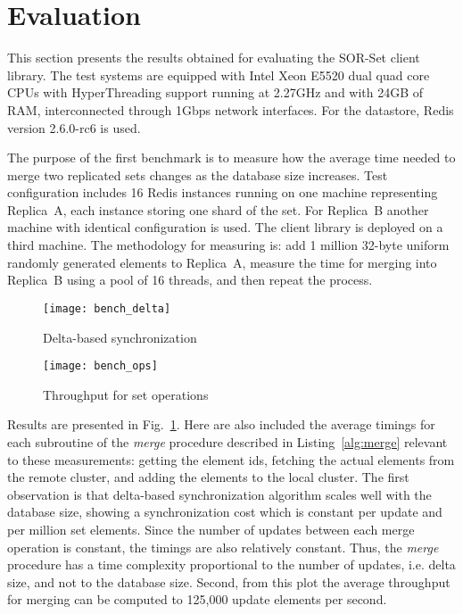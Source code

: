 \section{Evaluation}
\label{sec:evaluation}

This section presents the results obtained for evaluating the SOR-Set client
library. The test systems are equipped with Intel Xeon E5520 dual quad core
CPUs with HyperThreading support running at 2.27GHz and with 24GB of RAM,
interconnected through 1Gbps network interfaces. For the datastore, Redis
version 2.6.0-rc6 is used.

The purpose of the first benchmark is to measure how the average time needed to
merge two replicated sets changes as the database size increases. Test
configuration includes 16 Redis instances running on one machine representing
Replica~A, each instance storing one shard of the set. For Replica~B another
machine with identical configuration is used. The client library is deployed
on a third machine. The methodology for measuring is: add 1 million 32-byte
uniform randomly generated elements to Replica~A, measure the time for merging
into Replica~B using a pool of 16 threads, and then repeat the process.

\begin{figure}[t]
  \centering
  \begin{minipage}{1\linewidth}
    \centering
    \texttt{[image: bench\_delta]}
    \caption{Delta-based synchronization}
    \label{fig:bench_delta}
  \end{minipage}
\end{figure}

\begin{figure}[t]
  \centering
  \begin{minipage}{1\linewidth}
    \centering
    \texttt{[image: bench\_ops]}
    \caption{Throughput for set operations}
    \label{fig:bench_ops}
  \end{minipage}
\end{figure}

Results are presented in Fig.~\ref{fig:bench_delta}. Here are also included the
average timings for each subroutine  of the \textit{merge} procedure described
in Listing~\ref{alg:merge} relevant to these measurements: getting the element
ids, fetching the actual elements from the remote cluster, and adding the
elements to the local cluster. The first observation is that delta-based
synchronization algorithm scales well with the database size, showing a
synchronization cost which is constant per update and per million set elements.
Since the number of updates between each merge operation is constant, the
timings are also relatively constant. Thus, the \textit{merge} procedure has a
time complexity proportional to the number of updates, i.e. delta size, and not
to the database size. Second, from this plot the average throughput for merging
can be computed to 125,000 update elements per second.

